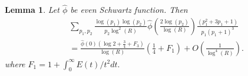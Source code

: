 \documentclass[11pt, reqno]{amsart}
\newtheorem{lemma}[theorem]{Lemma}
\theoremstyle{definition}
\theoremstyle{remark}
\numberwithin{equation}{section}
\renewcommand{\hat}{\widehat}
\begin{document}
\begin{lemma}\label{line2}
    Let $\hat\phi$ be even Schwartz function. Then
    \begin{equation}
        \begin{aligned}
        & \sum_{p_1,p_2} \frac{\log(p_1)\log(p_2)}{p_2\log^2(R)}\hat\phi\left(\frac{2\log(p_2)}{\log(R)}\right)\frac{(p_1^2+3p_1+1)}{p_1(p_1+1)^3}\\
        &=\frac{\hat\phi(0)(\log 2+\frac{3}{4}+F_3)}{\log(R)}\left(\frac{1}{4}+F_1\right)+O\left(\frac{1}{\log^4(R)}\right).
        \end{aligned}
    \end{equation}
    where $F_1=1+\int_0^\infty E(t)/t^2 dt.$ 
\end{lemma}
\end{document}
